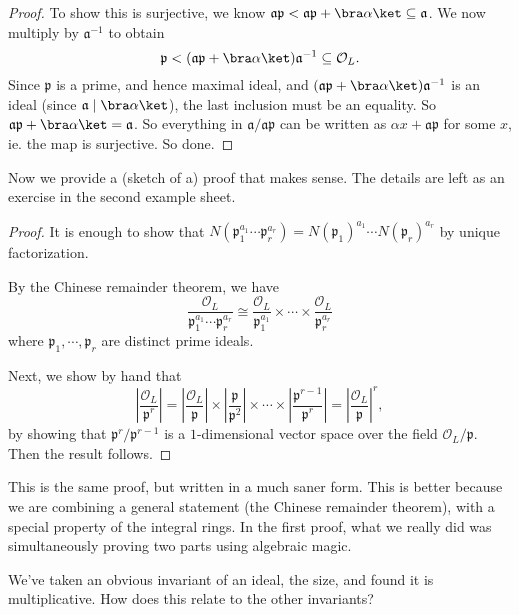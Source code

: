 \documentclass[a4paper]{article}
\begin{document}
\begin{proof}
  To show this is surjective, we know $\mathfrak{a}\mathfrak{p} < \mathfrak{a}\mathfrak{p} + \bra \alpha\ket \subseteq \mathfrak{a}$. We now multiply by $\mathfrak{a}^{-1}$ to obtain
  \[
    \mathfrak{p} < (\mathfrak{a} \mathfrak{p} + \bra \alpha\ket) \mathfrak{a}^{-1} \subseteq \mathcal{O}_L.
  \]
  Since $\mathfrak{p}$ is a prime, and hence maximal ideal, and $(\mathfrak{a} \mathfrak{p} + \bra \alpha\ket) \mathfrak{a}^{-1}$ is an ideal (since $\mathfrak{a} \mid \bra \alpha\ket$), the last inclusion must be an equality. So $\mathfrak{a}\mathfrak{p} + \bra\alpha\ket = \mathfrak{a}$. So everything in $\mathfrak{a}/\mathfrak{a}\mathfrak{p}$ can be written as $\alpha x + \mathfrak{a} \mathfrak{p}$ for some $x$, ie. the map is surjective. So done.
\end{proof}
Now we provide a (sketch of a) proof that makes sense. The details are left as an exercise in the second example sheet.
\begin{proof}
  It is enough to show that $N(\mathfrak{p}_1^{a_1} \cdots \mathfrak{p}_r^{a_r}) = N(\mathfrak{p}_1)^{a_1} \cdots N(\mathfrak{p}_r)^{a_r}$ by unique factorization.

  By the Chinese remainder theorem, we have
  \[
    \frac{\mathcal{O}_L}{\mathfrak{p}_1^{a_1} \cdots \mathfrak{p}_r^{a_r}} \cong \frac{\mathcal{O}_L}{\mathfrak{p}_1^{a_1}} \times \cdots \times \frac{\mathcal{O}_L}{\mathfrak{p}_r^{a_r}}
  \]
  where $\mathfrak{p}_1, \cdots, \mathfrak{p}_r$ are distinct prime ideals.

  Next, we show by hand that
  \[
    \left|\frac{\mathcal{O}_L}{\mathfrak{p}^r}\right| = \left|\frac{\mathcal{O}_L}{\mathfrak{p}}\right| \times \left|\frac{\mathfrak{p}}{\mathfrak{p}^2}\right| \times \cdots \times \left|\frac{\mathfrak{p}^{r - 1}}{\mathfrak{p}^r}\right| = \left|\frac{\mathcal{O}_L}{\mathfrak{p}}\right|^r,
  \]
  by showing that $\mathfrak{p}^r/\mathfrak{p}^{r - 1}$ is a $1$-dimensional vector space over the field $\mathcal{O}_L/\mathfrak{p}$. Then the result follows. %
\end{proof}
This is the same proof, but written in a much saner form. This is better because we are combining a general statement (the Chinese remainder theorem), with a special property of the integral rings. In the first proof, what we really did was simultaneously proving two parts using algebraic magic.

We've taken an obvious invariant of an ideal, the size, and found it is multiplicative. How does this relate to the other invariants?
\end{document}
